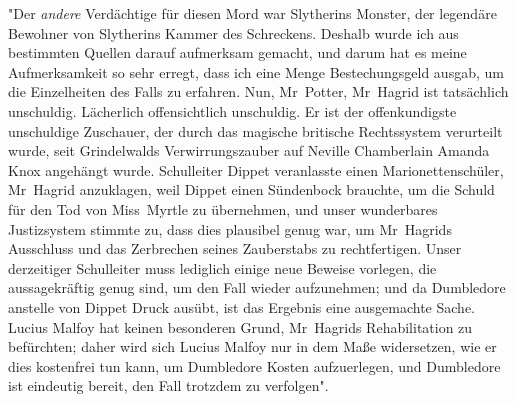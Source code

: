 "Der \emph{andere} Verdächtige für diesen Mord war Slytherins Monster, der legendäre Bewohner von Slytherins Kammer des Schreckens. Deshalb wurde ich aus bestimmten Quellen darauf aufmerksam gemacht, und darum hat es meine Aufmerksamkeit so sehr erregt, dass ich eine Menge Bestechungsgeld ausgab, um die Einzelheiten des Falls zu erfahren. Nun, Mr~Potter, Mr~Hagrid ist tatsächlich unschuldig. Lächerlich offensichtlich unschuldig. Er ist der offenkundigste unschuldige Zuschauer, der durch das magische britische Rechtssystem verurteilt wurde, seit Grindelwalds Verwirrungszauber auf Neville Chamberlain Amanda Knox angehängt wurde.
Schulleiter Dippet veranlasste einen Marionettenschüler, Mr~Hagrid anzuklagen, weil Dippet einen Sündenbock brauchte, um die Schuld für den Tod von Miss~Myrtle zu übernehmen, und unser wunderbares Justizsystem stimmte zu, dass dies plausibel genug war, um Mr~Hagrids Ausschluss und das Zerbrechen seines Zauberstabs zu rechtfertigen. Unser derzeitiger Schulleiter muss lediglich einige neue Beweise vorlegen, die aussagekräftig genug sind, um den Fall wieder aufzunehmen; und da Dumbledore anstelle von Dippet Druck ausübt, ist das Ergebnis eine ausgemachte Sache. Lucius Malfoy hat keinen besonderen Grund, Mr~Hagrids Rehabilitation zu befürchten; daher wird sich Lucius Malfoy nur in dem Maße widersetzen, wie er dies kostenfrei tun kann, um Dumbledore Kosten aufzuerlegen, und Dumbledore ist eindeutig bereit, den Fall trotzdem zu verfolgen".

